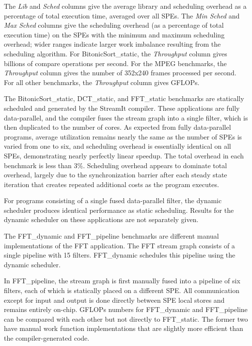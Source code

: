 The \emph{Lib} and \emph{Sched} columns give the average library and scheduling overhead
as a percentage of total execution time, averaged over all SPEs.
The \emph{Min Sched} and \emph{Max Sched} columns give the scheduling overhead
(as a percentage of total execution time) on the SPEs with the minimum and maximum
scheduling overhead; wider ranges indicate larger work imbalance
resulting from the scheduling algorithm.
For \textsf{BitonicSort\_static}, the \emph{Throughput} column gives
billions of compare operations per second. For the MPEG benchmarks,
the \emph{Throughput} column gives the number of 352x240 frames processed per second.
For all other benchmarks, the \emph{Throughput} column gives GFLOPs.

The \textsf{BitonicSort\_static}, \textsf{DCT\_static}, and \textsf{FFT\_static} benchmarks
are statically scheduled and generated by the StreamIt compiler.
These applications are fully data-parallel, and the compiler fuses the stream graph
into a single filter, which is then duplicated to the number of cores.
As expected from fully data-parallel programs, average utilization remains nearly the same
as the number of SPEs is varied from one to six, and scheduling overhead is essentially identical
on all SPEs, demonstrating nearly perfectly linear speedup.
The total overhead in each benchmark is less than 3\%. Scheduling overhead appears
to dominate total overhead, largely due to the synchronization barrier after each steady state
iteration that creates repeated additional costs as the program executes.

For programs consisting of a single fused data-parallel filter, the dynamic scheduler produces identical performance as static scheduling. Results for the dynamic scheduler on these applications are not separately given.

The \textsf{FFT\_dynamic} and \textsf{FFT\_pipeline} benchmarks are different manual implementations of the FFT application. The FFT stream graph consists of a single pipeline with 15 filters. \textsf{FFT\_dynamic} schedules this pipeline using the dynamic scheduler. 

In \textsf{FFT\_pipeline}, the stream graph is first manually fused into a pipeline of six filters, each of which is statically placed on a different SPE. All communication except for input and output is done directly between SPE local stores and remains entirely on-chip. GFLOPs numbers for \textsf{FFT\_dynamic} and \textsf{FFT\_pipeline} can be compared with each other but not directly to \textsf{FFT\_static}.
The former two have manual work function implementations that are slightly more efficient than the compiler-generated code.

